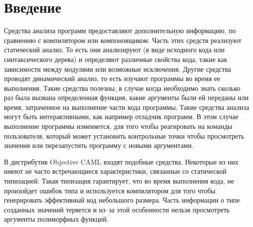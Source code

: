 \section {Введение}

Средства анализа программ предоставляют дополнительную информацию, по сравнению
с компилятором или компоновщиком. Часть этих средств реализуют статический
анализ. То есть они анализируют (в виде исходного кода или синтаксического
дерева) и определяют различные свойства кода, такие как зависимости между
модулями или возможные исключения. Другие средства проводят динамический анализ,
то есть изучают программы во время ее выполнения. Такие средства полезны, в
случае когда необходимо знать сколько раз была вызвана определенная функция,
какие аргументы были ей переданы или время, затраченное на выполнение части кода
программы. Такие средства анализа могут быть интерактивными, как например
отладчик программ. В этом случае выполнение программы изменяется, для того чтобы
реагировать на команды пользователя, который может установить контрольные точки
чтобы просмотреть значения или перезапустить программу с новыми аргументами.

В дистрибутив Objective CAML входят подобные средства. Некоторые из них имеют не
часто встречающиеся характеристики, связанные со статической типизацией. Такая
типизация гарантирует, что во время выполнения кода, не произойдет ошибок типа и
используется компилятором для того чтобы генерировать эффективный код небольшого
размера. Часть информации о типе созданных значений теряется и из–за этой
особенности нельзя просмотреть аргументы полиморфных функций.
